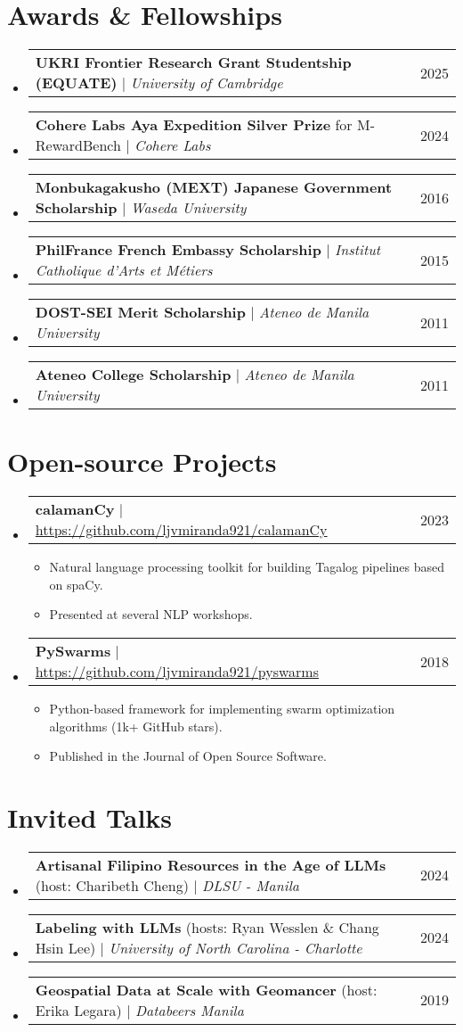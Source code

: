 \documentclass[a4paper,11pt]{article}
\makeatletter
\newcommand{\resumeItem}[1]{
  \item\small{
    {#1 \vspace{-2pt}}
  }
}
\newcommand{\resumeProjectHeading}[2]{
    \item
    \begin{tabular*}{0.97\textwidth}{l@{\extracolsep{\fill}}r}
      \small#1 & #2 \\
    \end{tabular*}\vspace{-7pt}
}
\newcommand{\resumeSubHeadingListStart}{\begin{itemize}[leftmargin=0.15in, label={}]}
\newcommand{\resumeSubHeadingListEnd}{\end{itemize}}
\newcommand{\resumeItemListStart}{\begin{itemize}}
\newcommand{\resumeItemListEnd}{\end{itemize}\vspace{-5pt}}
\makeatother
\begin{document}
\section{Awards \& Fellowships}
\resumeSubHeadingListStart
\resumeProjectHeading
{\textbf{UKRI Frontier Research Grant Studentship (EQUATE)} $|$ \emph{University of Cambridge}}{2025}
\resumeProjectHeading
{\textbf{Cohere Labs Aya Expedition Silver Prize} for M-RewardBench $|$ \emph{Cohere Labs}}{2024}
\resumeProjectHeading
{\textbf{Monbukagakusho (MEXT) Japanese Government Scholarship} $|$ \emph{Waseda University}}{2016}
\resumeProjectHeading
{\textbf{PhilFrance French Embassy Scholarship} $|$ \emph{Institut Catholique d'Arts et Métiers}}{2015}
\resumeProjectHeading
{\textbf{DOST-SEI Merit Scholarship} $|$ \emph{Ateneo de Manila University}}{2011}
\resumeProjectHeading
{\textbf{Ateneo College Scholarship} $|$ \emph{Ateneo de Manila University}}{2011}
\resumeSubHeadingListEnd

\section{Open-source Projects}
\resumeSubHeadingListStart
\resumeProjectHeading
{\textbf{calamanCy} $|$ \url{https://github.com/ljvmiranda921/calamanCy}}{2023}
\resumeItemListStart
\resumeItem{Natural language processing toolkit for building Tagalog pipelines based on spaCy.}
\resumeItem{Presented at several NLP workshops.}
\resumeItemListEnd
\resumeProjectHeading
{\textbf{PySwarms} $|$ \url{https://github.com/ljvmiranda921/pyswarms}}{2018}
\resumeItemListStart
\resumeItem{Python-based framework for implementing swarm optimization algorithms (1k+ GitHub stars).}
\resumeItem{Published in the Journal of Open Source Software.}
\resumeItemListEnd
\resumeSubHeadingListEnd

\section{Invited Talks}
\resumeSubHeadingListStart
\resumeProjectHeading
{\textbf{Artisanal Filipino Resources in the Age of LLMs} (host: Charibeth Cheng) $|$ \emph{DLSU - Manila}}{2024}
\resumeProjectHeading
{\textbf{Labeling with LLMs} (hosts: Ryan Wesslen \& Chang Hsin Lee) $|$ \emph{University of North Carolina - Charlotte}}{2024}
\resumeProjectHeading
{\textbf{Geospatial Data at Scale with Geomancer} (host: Erika Legara) $|$ \emph{Databeers Manila}}{2019}
\resumeSubHeadingListEnd
\end{document}
